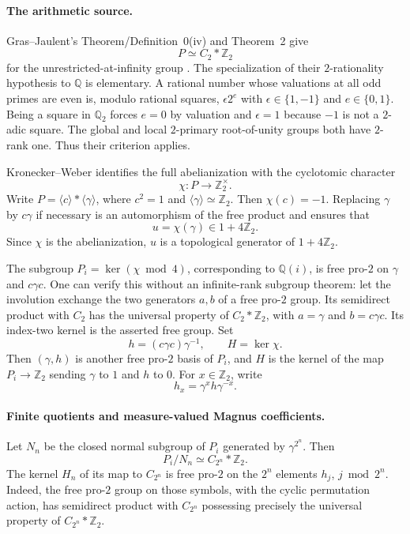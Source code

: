 \documentclass[11pt,a4paper]{article}
\theoremstyle{definition}
\begin{document}
\paragraph{The arithmetic source.}
Gras--Jaulent's Theorem/Definition~0(iv) and Theorem~2 give
\[
 P\simeq C_2*\mathbb Z_2
\]
for the unrestricted-at-infinity group \cite[pp.~1--3]{GrasJaulent2008}. The specialization of their $2$-rationality hypothesis to $\mathbb Q$ is elementary. A rational number whose valuations at all odd primes are even is, modulo rational squares, $\epsilon2^e$ with $\epsilon\in\{1,-1\}$ and $e\in\{0,1\}$. Being a square in $\mathbb Q_2$ forces $e=0$ by valuation and $\epsilon=1$ because $-1$ is not a $2$-adic square. The global and local $2$-primary root-of-unity groups both have $2$-rank one. Thus their criterion applies.

Kronecker--Weber identifies the full abelianization with the cyclotomic character
\[
 \chi:P\longrightarrow\mathbb Z_2^\times.
\]
Write $P=\langle c\rangle*\langle\gamma\rangle$, where $c^2=1$ and $\langle\gamma\rangle\simeq\mathbb Z_2$. Then $\chi(c)=-1$. Replacing $\gamma$ by $c\gamma$ if necessary is an automorphism of the free product and ensures that
\[
 u=\chi(\gamma)\in1+4\mathbb Z_2.
\]
Since $\chi$ is the abelianization, $u$ is a topological generator of $1+4\mathbb Z_2$.

The subgroup $P_i=\ker(\chi\bmod4)$, corresponding to $\mathbb Q(i)$, is free pro-$2$ on $\gamma$ and $c\gamma c$. One can verify this without an infinite-rank subgroup theorem: let the involution exchange the two generators $a,b$ of a free pro-$2$ group. Its semidirect product with $C_2$ has the universal property of $C_2*\mathbb Z_2$, with $a=\gamma$ and $b=c\gamma c$. Its index-two kernel is the asserted free group. Set
\[
 h=(c\gamma c)\gamma^{-1},\qquad H=\ker\chi.
\]
Then $(\gamma,h)$ is another free pro-$2$ basis of $P_i$, and $H$ is the kernel of the map $P_i\to\mathbb Z_2$ sending $\gamma$ to $1$ and $h$ to $0$. For $x\in\mathbb Z_2$, write
\[
 h_x=\gamma^xh\gamma^{-x}.
\]

\paragraph{Finite quotients and measure-valued Magnus coefficients.}
Let $N_n$ be the closed normal subgroup of $P_i$ generated by $\gamma^{2^n}$. Then
\[
 P_i/N_n\simeq C_{2^n}*\mathbb Z_2.
\]
The kernel $H_n$ of its map to $C_{2^n}$ is free pro-$2$ on the $2^n$ elements $h_j$, $j\bmod2^n$. Indeed, the free pro-$2$ group on those symbols, with the cyclic permutation action, has semidirect product with $C_{2^n}$ possessing precisely the universal property of $C_{2^n}*\mathbb Z_2$.
\end{document}
